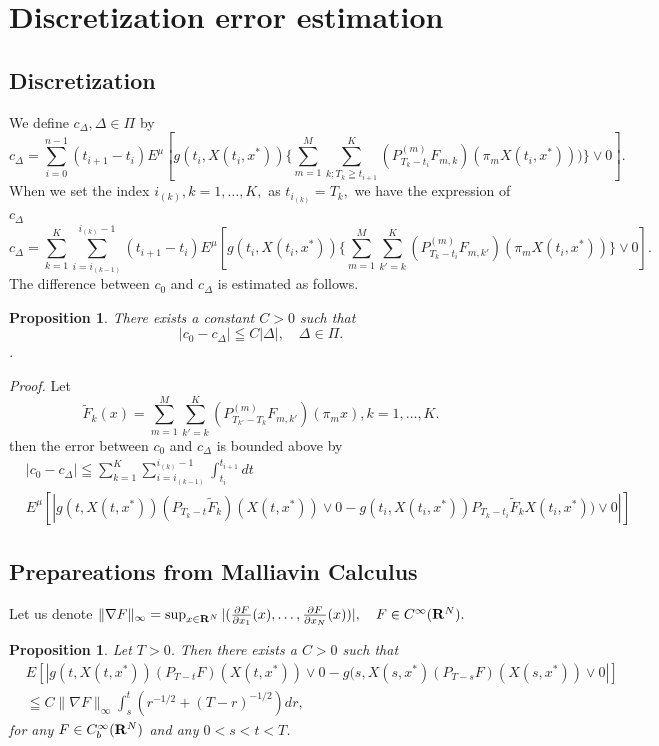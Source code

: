 \documentclass[12pt]{article}
\newtheorem{prop}[thm]{Proposition}%
\begin{document}
\section{Discretization error estimation}

\subsection{Discretization}
We define $c_{\Delta}, \Delta \in \Pi$ by
$$c_{\Delta}=\sum_{i=0}^{n-1}(t_{i+1}-t_i)
E^{\mu}[g(t_i,X(t_i,x^*))\{\sum_{m=1}^M\sum_{k; T_k \geqq t_{i+1}}^K(P_{T_k-t_i}^{(m)}F_{m,k})(\pi_mX(t_i,x^*))) \}\vee 0].
$$
When we set the index $i_{(k)}, k=1,\ldots, K,$ as $t_{i_{(k)}} = T_k,$
we have the expression of $c_{\Delta}$ 
$$
c_{\Delta}=\sum_{k=1}^K\sum_{i=i_{(k-1)}}^{{i_{(k)}}-1}(t_{i+1}-t_i) E^{\mu}[ g(t_i,X(t_i,x^*))\{
\sum_{m=1}^M \sum_{k'=k}^K(P_{T_k-t_i}^{(m)}F_{m, k'})(\pi_{m} X(t_i,x^*))\}\vee0 ].
 $$
The difference between $c_0$ and $c_{\Delta}$ is estimated as follows.
 \begin{prop}\label{time disc}
There exists a constant $C >0$ such that
$$
|c_0-c_{\Delta}| \leqq  C |\Delta|,\quad \Delta \in \Pi.$$.
\end{prop}
{\it Proof.}
Let $$\tilde{F}_{k}(x)=\sum_{m=1}^M \sum_{k'=k}^K (P_{T_{k'}-T_{k}}^{(m)}F_{m,k'})(\pi_m x), k=1,\ldots,K.$$ then  the error between $c_0$ and $c_{\Delta}$ is bounded above by
\begin{align*}
&|c_0- c_{\Delta}| \leqq   \sum_{k=1}^K \sum_{i=i_{(k-1)}}^{i_{(k)}-1} \int_{t_i}^{t_{i+1}} dt\\
& E^{\mu}\left[ \left |g(t,X(t,x^*)) (P_{T_{k}-t} \tilde{F}_{k})(X(t,x^*)) \vee 0
-  g(t_i,X(t_i,x^*)) P_{T_{k}-t_i} \tilde{F}_{k} X(t_i,x^*)) \vee 0 \right| \right]
\end{align*}

\subsection{Prepareations from Malliavin Calculus}
Let us denote $\|\nabla F\|_{\infty}=\sup_{x \in {\bf R}^N}|(\frac{\partial F}{\partial x_1}(x), \ldots, \frac{\partial F}{\partial x_N}(x))|, \quad F \in C^{\infty}({\bf R}^N).$
\begin{prop}\label{discProp}
Let $T>0$. Then there exists a $C>0$ such that 
\begin{align*}
&E[|g(t,X(t,x^*))(P_{T-t}F)(X(t,x^*)) \vee 0 - g(s,X(s,x^*)(P_{T-s}F)(X(s,x^*)) \vee 0|]\\
&\leqq C \|\nabla F\|_{\infty} \int_{s}^t(r^{-1/2}+(T-r)^{-1/2})dr ,
\end{align*}
for any $ F \in C_b^{\infty}({\bf R}^{N})$ and any $0< s < t< T$. 
\end{prop}
\end{document}
